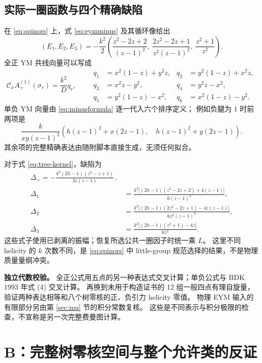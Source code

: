 \documentclass[UTF8,a4paper,11pt,fontset=fandol]{ctexart}
\newcommand{\Cx}{\mathcal C_x}
\begin{document}
\subsection{实际一圈函数与四个精确缺陷}
在 \eqref{eq:spinors} 上，式 \eqref{eq:eymminus} 及其循环像给出
\begin{equation}
 (E_1,E_2,E_3)=-\frac{k^2}{2}
 \left(\frac{z^2-2z+2}{(z-1)^2},\
 \frac{2z^2-2z+1}{z^2(z-1)^2},\
 \frac{z^2+1}{z^2}\right).
\label{eq:eym-vector}
\end{equation}
全正 YM 共线向量可以写成
\begin{equation}
 \Cx A^{(1)}_+(\sigma_r)=\frac{k^2}{D}q_r,\qquad
 \begin{aligned}
 q_1&=x^2(1-z)+y^2z,&q_2&=y^2(1-z)+x^2z,\\
 q_3&=x^2z-y^2,&q_4&=y^2z-x^2,\\
 q_5&=y^2(1-z)-x^2,&q_6&=x^2(1-z)-y^2.
 \end{aligned}\label{eq:q-vector}
\end{equation}
单负 YM 向量由 \eqref{eq:minusformula} 逐一代入六个排序定义；
例如负腿为 $1$ 时前两项是
\begin{equation}
 \frac{k}{xy(z-1)^2}
 \left(h(z-1)^2+x(2z-1),\quad h(z-1)^2+y(2z-1)\right).
\end{equation}
其余项的完整精确表达由随附脚本直接生成，无须任何拟合。

对于式 \eqref{eq:tree-kernel}，缺陷为
\begin{align}
 \boxed{\Delta_+=-\frac{k^3(2h-1)(z^2-z+1)}{3z(z-1)}}\,,\label{eq:dplus}\\
 \Delta_1&=\frac{k^2\big[(2h-1)(z^2-2z+2)+4(z-1)\big]}{6(z-1)^2},\\
 \Delta_2&=\frac{k^2\big[(2h-1)(2z^2-2z+1)-4z(z-1)\big]}{6z^2(z-1)^2},\\
 \Delta_3&=\frac{k^2\big[(2h-1)(z^2+1)-4z\big]}{6z^2}.
\label{eq:dminus}
\end{align}
这些式子使用已剥离的振幅；恢复所选公共一圈因子时统一乘 $L$。
这里不同 helicity 的 $k$ 次数不同，是 \eqref{eq:spinors} 中 little-group
规范选择的结果，不是物理质量量纲冲突。

\textbf{独立代数校验。}
全正公式用五点的另一种表达式交叉计算；单负公式与 BDK 1993 年式 (4) 交叉计算。
再换到未用于构造证书的 12 组一般四点有理自旋量，验证两种表达相等和八个树零核的正、负引力 helicity 零值。
物理 EYM 输入的有限部分另由第 \ref{sec:mu} 节的积分常数复核。
这些是不同表示与积分极限的检查，不宣称是另一次完整费曼图计算。

\section{B：完整树零核空间与整个允许类的反证}
\end{document}
